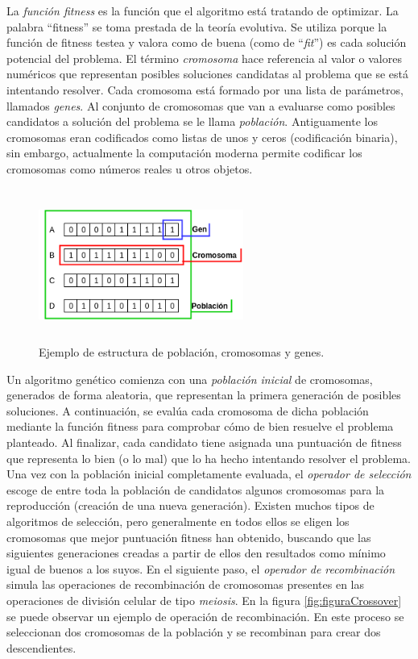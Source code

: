 La \textit{función fitness} es la función que el algoritmo está tratando de optimizar. La palabra ``fitness'' se toma prestada de la teoría evolutiva.
Se utiliza porque la función de fitness testea y valora como de buena (como de ``\textit{fit}'') es cada solución potencial del problema. El término
\textit{cromosoma} hace referencia al valor o valores numéricos que representan posibles soluciones candidatas al problema que se está intentando resolver.
Cada cromosoma está formado por una lista de parámetros, llamados \textit{genes}. Al conjunto de cromosomas que van a evaluarse como posibles candidatos a solución
del problema se le llama \textit{población}. Antiguamente los cromosomas eran codificados como listas de unos y ceros (codificación binaria), sin embargo, actualmente la computación
moderna permite codificar los cromosomas como números reales u otros objetos.

\begin{figure}[H]
    \centering
    \includegraphics[width=0.6\textwidth,height=5cm]{Imagenes/PoblacionGA}
    \caption{Ejemplo de estructura de población, cromosomas y genes.}
    \label{fig:figuraPoblacionGA}
\end{figure}

Un algoritmo genético comienza con una \textit{población inicial} de cromosomas, generados de forma aleatoria, que representan la primera generación de posibles soluciones. A continuación,
se evalúa cada cromosoma de dicha población mediante la función fitness para comprobar cómo de bien resuelve el problema planteado. Al finalizar, cada candidato tiene asignada una puntuación
de fitness que representa lo bien (o lo mal) que lo ha hecho intentando resolver el problema.
Una vez con la población inicial completamente evaluada, el \textit{operador de selección} escoge de entre toda la población de candidatos algunos cromosomas para la reproducción (creación
de una nueva generación). Existen muchos tipos de algoritmos de selección, pero generalmente en todos ellos se eligen los cromosomas que mejor puntuación fitness han obtenido, buscando que
las siguientes generaciones creadas a partir de ellos den resultados como mínimo igual de buenos a los suyos.
En el siguiente paso, el \textit{operador de recombinación} simula las operaciones de recombinación de cromosomas presentes en las operaciones de división celular de tipo \textit{meiosis}. En la figura
\ref{fig:figuraCrossover} se puede observar un ejemplo de operación de recombinación. En este proceso se seleccionan dos cromosomas de la población y se recombinan para crear dos descendientes.

